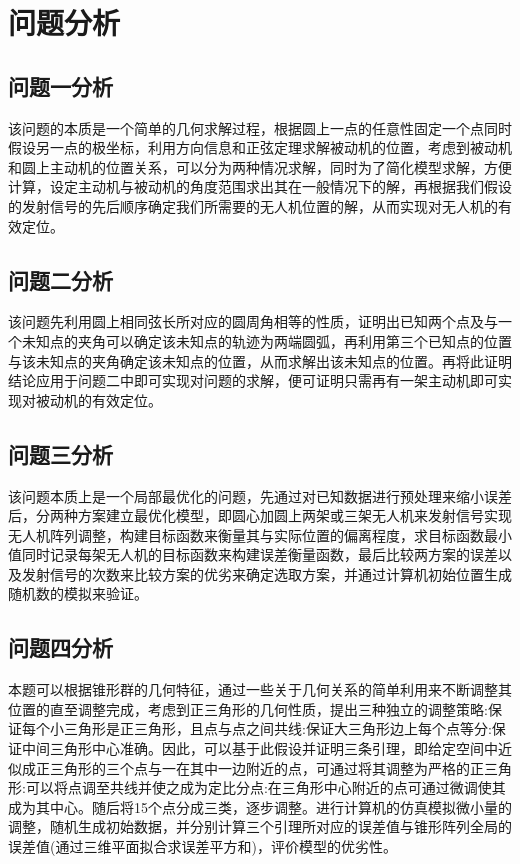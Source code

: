 \documentclass[withoutpreface,bwprint]{cumcmthesis} %
\begin{document}
\section{问题分析}

\subsection{问题一分析}
该问题的本质是一个简单的几何求解过程，根据圆上一点的任意性固定一个点同时假设另一点的极坐标，利用方向信息和正弦定理求解被动机的位置，考虑到被动机和圆上主动机的位置关系，可以分为两种情况求解，同时为了简化模型求解，方便计算，设定主动机与被动机的角度范围求出其在一般情况下的解，再根据我们假设的发射信号的先后顺序确定我们所需要的无人机位置的解，从而实现对无人机的有效定位。

\subsection{问题二分析}
该问题先利用圆上相同弦长所对应的圆周角相等的性质，证明出已知两个点及与一个未知点的夹角可以确定该未知点的轨迹为两端圆弧，再利用第三个已知点的位置与该未知点的夹角确定该未知点的位置，从而求解出该未知点的位置。再将此证明结论应用于问题二中即可实现对问题的求解，便可证明只需再有一架主动机即可实现对被动机的有效定位。

\subsection{问题三分析}
该问题本质上是一个局部最优化的问题，先通过对已知数据进行预处理来缩小误差后，分两种方案建立最优化模型，即圆心加圆上两架或三架无人机来发射信号实现无人机阵列调整，构建目标函数来衡量其与实际位置的偏离程度，求目标函数最小值同时记录每架无人机的目标函数来构建误差衡量函数，最后比较两方案的误差以及发射信号的次数来比较方案的优劣来确定选取方案，并通过计算机初始位置生成随机数的模拟来验证。

\subsection{问题四分析}
本题可以根据锥形群的几何特征，通过一些关于几何关系的简单利用来不断调整其位置的直至调整完成，考虑到正三角形的几何性质，提出三种独立的调整策略:保证每个小三角形是正三角形，且点与点之间共线:保证大三角形边上每个点等分:保证中间三角形中心准确。因此，可以基于此假设并证明三条引理，即给定空间中近似成正三角形的三个点与一在其中一边附近的点，可通过将其调整为严格的正三角形:可以将点调至共线并使之成为定比分点:在三角形中心附近的点可通过微调使其成为其中心。随后将15个点分成三类，逐步调整。进行计算机的仿真模拟微小量的调整，随机生成初始数据，并分别计算三个引理所对应的误差值与锥形阵列全局的误差值(通过三维平面拟合求误差平方和)，评价模型的优劣性。
\end{document}
